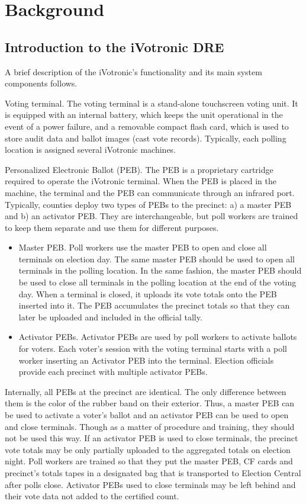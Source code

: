 \documentclass[letterpaper,twocolumn,10pt]{article}
\begin{document}
\section{Background}
\subsection{Introduction to the iVotronic DRE}
A brief description of the iVotronic's functionality and its main system
components follows.  

\begin{description}
\item{Voting terminal.} The voting terminal is a stand-alone touchscreen voting
  unit. It is equipped with an internal battery, which keeps the unit operational 
  in the event of a power failure, and a removable compact flash card, which is 
  used to store audit data and ballot images (cast vote records).  Typically, 
  each polling location is assigned several iVotronic machines.
\item{Personalized Electronic Ballot (PEB).} The PEB is a proprietary cartridge
  required to operate the iVotronic terminal. When the PEB is placed in the 
  machine, the terminal and the PEB can communicate through an infrared port.  
  Typically, counties deploy two types of PEBs to the precinct: a) a master PEB
  and b) an activator PEB. They are interchangeable, but poll workers are trained 
  to keep them separate and use them for different purposes.
\begin{itemize}
\item{Master PEB.} Poll workers use the master PEB to open and close all
  terminals on election day. The same master PEB should be used to open all 
  terminals in the polling location.  In the same fashion, the master PEB should
  be used to close all terminals in the polling location at the end of the voting
  day.  When a terminal is closed, it uploads its vote totals onto the PEB 
  inserted into it. The PEB accumulates the precinct totals so that they can 
  later be uploaded and included in the official tally.
\item{Activator PEBs.} Activator PEBs are used by poll workers to activate ballots
  for voters. Each voter's session with the voting terminal starts with a poll
  worker inserting an Activator PEB into the terminal. Election officials provide 
  each precinct with multiple activator PEBs.  
\end{itemize}

Internally, all PEBs at the precinct are identical. The only
difference between them is the color of the rubber band on their
exterior. Thus, a master PEB can be used to activate a voter's ballot
and an activator PEB can be used to open and close terminals. Though
as a matter of procedure and training, they should not be used this
way. If an activator PEB is used to close terminals, the precinct vote
totals may be only partially uploaded to the aggregated totals on
election night. Poll workers are trained so that they put the master
PEB, CF cards and precinct's totals tapes in a designated bag that is
transported to Election Central after polls close.  Activator PEBs
used to close terminals may be left behind and their vote data not
added to the certified count.


\end{description}
\end{document}
